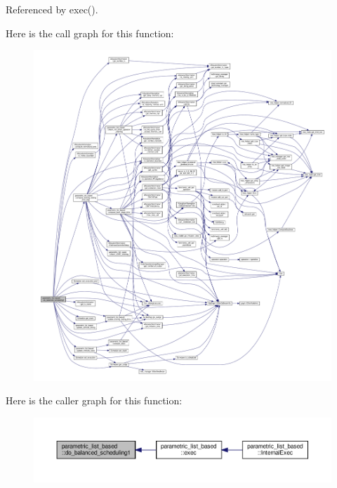 Referenced by exec().

Here is the call graph for this function\+:
\nopagebreak
\begin{figure}[H]
\begin{center}
\leavevmode
\includegraphics[width=350pt]{d7/d47/classparametric__list__based_a3015cd6577b9542929207800840b6acf_cgraph}
\end{center}
\end{figure}
Here is the caller graph for this function\+:
\nopagebreak
\begin{figure}[H]
\begin{center}
\leavevmode
\includegraphics[width=350pt]{d7/d47/classparametric__list__based_a3015cd6577b9542929207800840b6acf_icgraph}
\end{center}
\end{figure}
\mbox{\label{classparametric__list__based_abc6a741625056fc292a4ef5e58297ad4}} 
